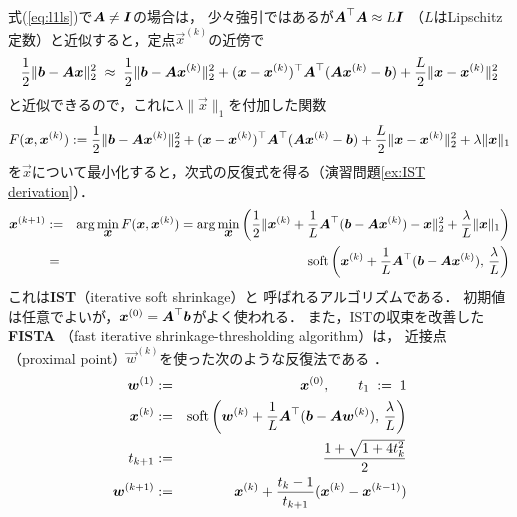 式(\ref{eq:l1ls})で$\mtr A\neq\mtr I$の場合は，
少々強引ではあるが$\mtr A^\top\mtr A\approx L\mtr I$
（$L$はLipschitz定数）と近似すると，定点$\vec x^{(k)}$の近傍で
\[
\frac{1}{2}\|\vec b-\mtr A\vec x\|_2^2
\;\approx\;
\frac{1}{2}\|\vec b-\mtr A\vec x^{(k)}\|_2^2
+(\vec x-\vec x^{(k)})^\top\mtr A^\top(\mtr A\vec x^{(k)}-\vec b)
+\frac{L}{2}\|\vec x-\vec x^{(k)}\|_2^2
\]
と近似できるので，これに$\lambda\|\vec x\|_1$を付加した関数
\[
 F(\vec x,\vec x^{(k)}) \defas \frac{1}{2}\|\vec b-\mtr A\vec x^{(k)}\|_2^2
+(\vec x-\vec x^{(k)})^\top\mtr A^\top(\mtr A\vec x^{(k)}-\vec b)
+\frac{L}{2}\|\vec x-\vec x^{(k)}\|_2^2+\lambda\|\vec x\|_1
\]
を$\vec x$について最小化すると，次式の反復式を得る（演習問題\ref{ex:IST derivation}）．
\begin{eqnarray}
 \vec x^{(k+1)}&\defas&\arg\min_{\vec x}F(\vec x,\vec x^{(k)})
=\arg\min_{\vec x}\left(
\frac{1}{2}\|\vec x^{(k)}+\frac{1}{L}\mtr A^\top(\vec b-\mtr A\vec x^{(k)})-\vec x\|_2^2+\frac{\lambda}{L}\|\vec x\|_1\right)
\label{eq:IST derivation}\\
&=&\soft\left(\vec x^{(k)}+\frac{1}{L}\mtr A^\top(\vec b-\mtr A\vec x^{(k)}),\,\frac{\lambda}{L}\right)\nonumber
\end{eqnarray}
これは{\bf IST}（iterative soft shrinkage）\cite{Daubechies04}と
呼ばれるアルゴリズムである．
初期値は任意でよいが，$\vec x^{(0)}=\mtr A^\top\vec b$がよく使われる．
また，ISTの収束を改善した{\bf FISTA}
（fast iterative shrinkage-thresholding algorithm）\cite{Beck09}は，
近接点（proximal point）$\vec w^{(k)}$を使った次のような反復法である
\cite{Nesterov83,Nesterov07,Beck09}．
\begin{eqnarray*}
\vec w^{(1)} & \defas & \vec x^{(0)},\qquad t_1\;\defas\;1\\
 \vec x^{(k)} & \defas & 
\soft\left(\vec w^{(k)}+\frac{1}{L}\mtr A^\top(\vec b-\mtr A\vec w^{(k)}),\,\frac{\lambda}{L}\right)\\
t_{k+1} &\defas& \frac{1+\sqrt{1+4t_k^2}}{2}\\
\vec w^{(k+1)} & \defas & \vec x^{(k)}+\frac{t_k-1}{t_{k+1}}(\vec x^{(k)}-\vec x^{(k-1)})
\end{eqnarray*}



